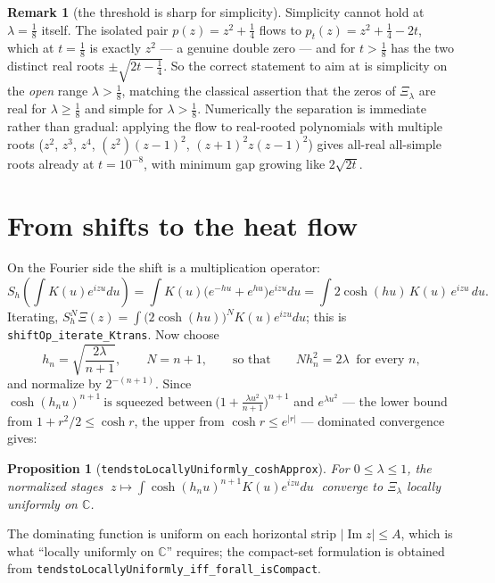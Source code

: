 \documentclass[11pt]{article}
\newtheorem{proposition}[theorem]{Proposition}
\theoremstyle{definition}
\newtheorem{remark}[theorem]{Remark}
\DeclareMathOperator{\Imop}{Im}
\begin{document}
\begin{remark}[the threshold is sharp for simplicity]\label{rem:sharp}
Simplicity cannot hold at $\lambda=\tfrac18$ itself.  The isolated pair $p(z)=z^{2}+\tfrac14$ flows to
$p_t(z)=z^{2}+\tfrac14-2t$, which at $t=\tfrac18$ is exactly $z^{2}$ --- a genuine double zero --- and
for $t>\tfrac18$ has the two distinct real roots $\pm\sqrt{2t-\tfrac14}$.  So the correct statement to
aim at is simplicity on the \emph{open} range $\lambda>\tfrac18$, matching the classical assertion that
the zeros of $\Xi_\lambda$ are real for $\lambda\ge\tfrac18$ and simple for $\lambda>\tfrac18$.
Numerically the separation is immediate rather than gradual: applying the flow to real-rooted
polynomials with multiple roots ($z^{2}$, $z^{3}$, $z^{4}$, $(z^2)(z-1)^2$, $(z+1)^2z(z-1)^2$) gives
all-real all-simple roots already at $t=10^{-8}$, with minimum gap growing like $2\sqrt{2t}$.
\end{remark}

\section{From shifts to the heat flow}\label{sec:cosh}

On the Fourier side the shift is a multiplication operator:
\[
  S_h\!\left(\int K(u)e^{izu}du\right)
  =\int K(u)\bigl(e^{-hu}+e^{hu}\bigr)e^{izu}du
  =\int 2\cosh(hu)\,K(u)\,e^{izu}\,du .
\]
Iterating, $S_h^{N}\Xi(z)=\int\bigl(2\cosh(hu)\bigr)^{N}K(u)e^{izu}du$; this is
\texttt{shiftOp\_iterate\_Ktrans}.  Now choose
\[
  h_n=\sqrt{\frac{2\lambda}{n+1}},\qquad N=n+1,
  \qquad\text{so that}\qquad Nh_n^{2}=2\lambda\ \text{ for every } n,
\]
and normalize by $2^{-(n+1)}$.  Since
$\cosh(h_nu)^{n+1}\ \text{is squeezed between}\ \bigl(1+\tfrac{\lambda u^{2}}{n+1}\bigr)^{n+1}$ and
$e^{\lambda u^{2}}$ --- the lower bound from $1+r^{2}/2\le\cosh r$, the upper from
$\cosh r\le e^{|r|}$ --- dominated convergence gives:

\begin{proposition}[\texttt{tendstoLocallyUniformly\_coshApprox}]\label{prop:cosh}
For $0\le\lambda\le1$, the normalized stages
$\;z\mapsto\int\cosh(h_nu)^{n+1}K(u)e^{izu}du\;$ converge to $\Xi_\lambda$ locally uniformly on
$\mathbb C$.
\end{proposition}

The dominating function is uniform on each horizontal strip $|\Imop z|\le A$, which is what
``locally uniformly on $\mathbb C$'' requires; the compact-set formulation is obtained from
\texttt{tendstoLocallyUniformly\_iff\_forall\_isCompact}.
\end{document}
